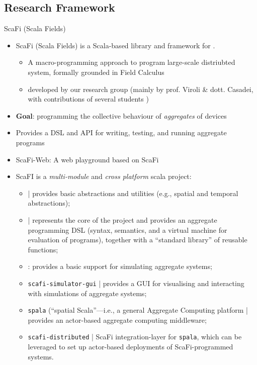 \documentclass[presentation, 9pt]{beamer}\mode<presentation>{\usetheme{AMSBolognaFC}}
\begin{document}
\subsection{Research Framework}
\begin{frame}{ScaFi (Scala Fields)}
\begin{itemize}
	\item ScaFi (Scala Fields) is a Scala-based library and framework for .
	\begin{itemize}
		\item A macro-programming approach to program large-scale distriubted system, formally grounded in Field Calculus
		\item developed by our research group (mainly by prof. Viroli \& dott. Casadei, with contributions of several students \href{https://github.com/scafi/scafi/graphs/contributors}{\faLink})
	\end{itemize}
	\item \textbf{Goal}: programming the collective behaviour of \emph{aggregates} of devices
 	\item Provides a DSL and API for writing, testing, and running aggregate programs
  \item ScaFi-Web: A web playground based on ScaFi \href{https://scafi.github.io/web/}{\faLink}
	\item ScaFI is a \emph{multi-module} and \emph{cross platform} scala project:
	\begin{itemize}
		\item \texttt{} | provides basic abstractions and utilities (e.g., spatial and temporal abstractions);
		\item \texttt{} | represents the core of the project and provides an aggregate programming DSL (syntax, semantics, and a virtual machine for evaluation of programs), together with a ``standard library'' of reusable functions;
		\item \texttt{}: provides a basic support for simulating aggregate systems;
		\item \texttt{scafi-simulator-gui} | provides a GUI for visualising and interacting with simulations of aggregate systems;
		\item \texttt{spala} (``spatial Scala''---i.e., a general Aggregate Computing platform | provides an actor-based aggregate computing middleware;
		\item \texttt{scafi-distributed} |  ScaFi integration-layer for \texttt{spala}, which can be leveraged to set up actor-based deployments of ScaFi-programmed systems.
		\end{itemize}
\end{itemize}


\end{frame}
\end{document}
